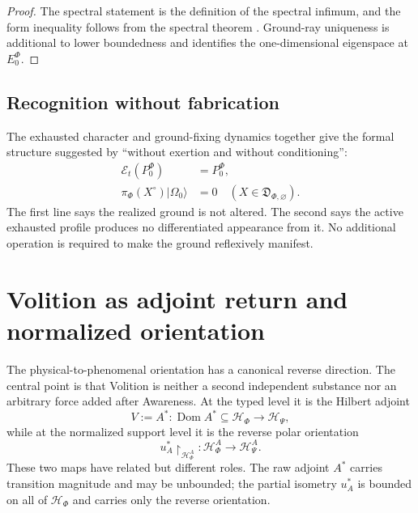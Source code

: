 \documentclass[11pt,reqno]{scrartcl}
\newcommand{\scrHP}{\mathscr H_{\Psi}}
\newcommand{\scrHF}{\mathscr H_{\Phi}}
\newcommand{\piF}{\pi_{\Phi}}
\newcommand{\PzeroF}{P_{0}^{\Phi}}
\newcommand{\polA}{u_A}
\newcommand{\ket}[1]{\lvert #1\rangle}
\DeclareMathOperator{\Dom}{Dom}
\newcommand{\restr}[2]{#1\!\upharpoonright_{#2}}
\newcommand{\actHP}{\mathscr H_{\Psi}^{A}}
\newcommand{\actHF}{\mathscr H_{\Phi}^{A}}
\newcommand{\detAlgEmpty}{\mathfrak D_{\Phi,\varnothing}}
\theoremstyle{plain}
\theoremstyle{definition}
\theoremstyle{remark}
\begin{document}
\begin{proof}
The spectral statement is the definition of the spectral infimum, and the
form inequality follows from the spectral theorem \cite{Kato,ReedSimon}.
Ground-ray uniqueness is additional to lower boundedness and identifies the
one-dimensional eigenspace at $E_0^{\Phi}$.
\end{proof}

\subsection{Recognition without fabrication}

The exhausted character and ground-fixing dynamics together give the formal
structure suggested by ``without exertion and without conditioning'':
\begin{equation}
  \boxed{
  \begin{aligned}
  \mathcal E_t(\PzeroF)&=\PzeroF,
  \\
  \piF(X^{\circ})\ket{\Omega_0}&=0
  \quad(X\in\detAlgEmpty).
  \end{aligned}}
  \label{eq:unconditioned-ground-two-conditions}
\end{equation}
The first line says the realized ground is not altered.  The second says the
active exhausted profile produces no differentiated appearance from it.  No
additional operation is required to make the ground reflexively manifest.
\section{Volition as adjoint return and normalized orientation}
\label{sec:volition-return-orientation}

The physical-to-phenomenal orientation has a canonical reverse direction.  The
central point is that Volition is neither a second independent substance nor
an arbitrary force added after Awareness.  At the typed level it is the
Hilbert adjoint
\begin{equation}
  \boxed{
  V:=A^*:\Dom A^*\subseteq\scrHF\longrightarrow\scrHP,}
  \label{eq:typed-volition}
\end{equation}
while at the normalized support level it is the reverse polar orientation
\begin{equation}
  \boxed{
  \restr{\polA^*}{\actHF}:\actHF\longrightarrow\actHP.}
  \label{eq:polar-volition}
\end{equation}
These two maps have related but different roles.  The raw adjoint $A^*$
carries transition magnitude and may be unbounded; the partial isometry
$u_A^*$ is bounded on all of $\scrHF$ and carries only the reverse orientation.
\end{document}
